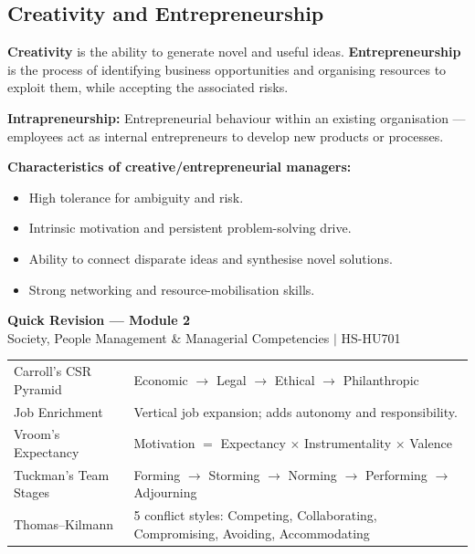 \documentclass[12pt,a4paper]{article}
\renewcommand{\arraystretch}{1.45}
\begin{document}
\subsection{Creativity and Entrepreneurship}

\begin{tcolorbox}[defbox, title={\textbf{Creativity and Entrepreneurship}}]
\textbf{Creativity} is the ability to generate novel and useful ideas. \textbf{Entrepreneurship} is the process of identifying business opportunities and organising resources to exploit them, while accepting the associated risks.
\par\vspace{3pt}
\textbf{Intrapreneurship:} Entrepreneurial behaviour within an existing organisation --- employees act as internal entrepreneurs to develop new products or processes.
\end{tcolorbox}

\textbf{Characteristics of creative/entrepreneurial managers:}
\begin{itemize}[leftmargin=*, itemsep=2pt]
  \item High tolerance for ambiguity and risk.
  \item Intrinsic motivation and persistent problem-solving drive.
  \item Ability to connect disparate ideas and synthesise novel solutions.
  \item Strong networking and resource-mobilisation skills.
\end{itemize}

\newpage
\begin{center}
  {\large\bfseries\color{myred} Quick Revision --- Module 2}\\[3pt]
  {\small\color{mydark} Society, People Management \& Managerial Competencies $|$ HS-HU701}
\end{center}
\noindent{\color{myred}\rule{\linewidth}{1.2pt}}
\vspace{4pt}

\begin{tcolorbox}[formulabox, title={\textbf{Key Frameworks at a Glance}}]
\renewcommand{\arraystretch}{1.3}
\begin{tabularx}{\linewidth}{B{4.0cm} X}Carroll's CSR Pyramid & Economic $\to$ Legal $\to$ Ethical $\to$ Philanthropic \\[3pt]
Job Enrichment & Vertical job expansion; adds autonomy and responsibility. \\[3pt]
Vroom's Expectancy & Motivation $=$ Expectancy $\times$ Instrumentality $\times$ Valence \\[3pt]
Tuckman's Team Stages & Forming $\to$ Storming $\to$ Norming $\to$ Performing $\to$ Adjourning \\[3pt]
Thomas--Kilmann & 5 conflict styles: Competing, Collaborating, Compromising, Avoiding, Accommodating \\
\end{tabularx}
\end{tcolorbox}
\end{document}
